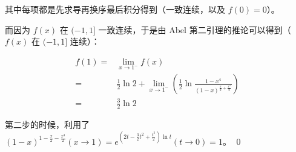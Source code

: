 其中每项都是先求导再换序最后积分得到（一致连续，以及 $f(0) = 0$）。

而因为 $f(x)$ 在 $(-1,1]$ 一致连续，于是由 Abel 第二引理的推论可以得到（$f(x)$ 在 $(-1,1]$ 连续）：

$$
\begin{aligned}
	f(1)=&\lim_{x\to 1^-}f(x)\\
	=&\frac{1}{2}\ln 2 + \lim_{x\to 1^-} \left(\frac{1}{2}\ln\frac{1-x^4}{(1-x)^{\frac{x}{2}+\frac{x^3}{2}}}\right)\\
	=&\frac{3}{2}\ln 2
\end{aligned}
$$

第二步的时候，利用了 $(1-x)^{1-\frac{x}{2}-\frac{x^3}{2}}(x\to 1)=e^{(2t-\frac{3}{2}t^2 + \frac{t^3}{2})\ln t}(t\to0)=1$。
\qed 



\ifx\allfiles\undefined

\fi